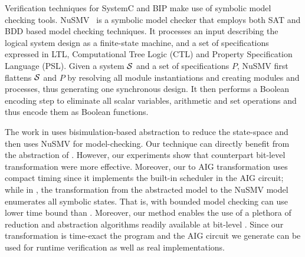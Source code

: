 Verification techniques for SystemC and BIP make use of symbolic model checking tools. 
NuSMV~\cite{nusmv} is a symbolic model checker that employs both 
SAT and BDD based model checking techniques. It processes an input 
describing the logical system design as a finite-state machine, and a set of specifications
expressed in LTL, Computational Tree Logic (CTL) and Property Specification Language (PSL).
Given a system $\mathcal{S}$ and a set of specifications $P$, NuSMV first flattens $\mathcal{S}$ and $P$ by 
resolving all module instantiations and creating modules and processes, thus generating one 
synchronous design. It then performs a Boolean encoding step to eliminate all scalar variables, 
arithmetic and set operations and thus encode them as Boolean functions.


The work in \cite{facs14} uses bisimulation-based abstraction to reduce the state-space and then uses NuSMV for model-checking. Our technique can directly benefit from the abstraction of \cite{facs14}. However, our experiments show that counterpart bit-level transformation were more effective. Moreover, our \caig to AIG transformation uses compact timing since it implements the built-in scheduler in the AIG circuit; while in \cite{facs14}, the transformation from the abstracted model to the NuSMV model enumerates all symbolic states. That is, with \biptool{} bounded model checking can use lower time bound than \cite{facs14}. Moreover, our method enables the use of a plethora of reduction and abstraction algorithms readily available at bit-level \cite{brayton2010abc}. 
Since our transformation is time-exact the \caig program and the AIG circuit we generate can be used for runtime verification as well as real implementations. 

